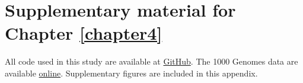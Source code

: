 \chapter{Supplementary material for Chapter \ref{chapter4}} \label{appxC}

All code used in this study are available at \href{https://github.com/ziyimo/popgen-dom-adapt}{GitHub}. The 1000 Genomes data are available \href{https://www.internationalgenome.org/data}{online}. Supplementary figures are included in this appendix.

